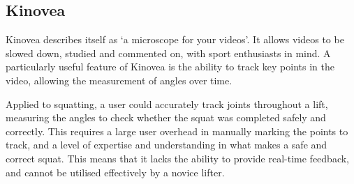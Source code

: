 \subsection{Kinovea}

Kinovea\cite{kinovea} describes itself as `a microscope for your videos'. It allows videos to be slowed down, studied and commented on, with sport enthusiasts in mind. A particularly useful feature of Kinovea is the ability to track key points in the video, allowing the measurement of angles over time. 

Applied to squatting, a user could accurately track joints throughout a lift, measuring the angles to check whether the squat was completed safely and correctly. This requires a large user overhead in manually marking the points to track, and a level of expertise and understanding in what makes a safe and correct squat. This means that it lacks the ability to provide real-time feedback, and cannot be utilised effectively by a novice lifter.